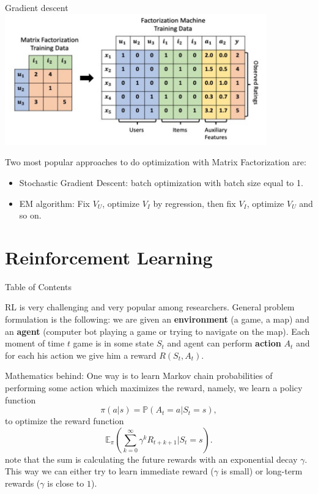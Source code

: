 \documentclass{beamer}
\theoremstyle{remark}
\begin{document}
\begin{frame}{Gradient descent}
    \includegraphics[width=0.85\textwidth]{pictures/recsysfm.png}
    
    Two most popular approaches to do optimization with Matrix Factorization are: 
    \begin{itemize}
        \item Stochastic Gradient Descent: batch optimization with batch size equal to 1.
        \item EM algorithm: Fix $V_{U}$, optimize $V_{I}$ by regression, then fix $V_{I}$, optimize $V_{U}$ and so on.
    \end{itemize}
\end{frame}

\section{Reinforcement Learning}

\begin{frame}{Table of Contents}
    \tableofcontents[currentsection]
\end{frame}

\begin{frame}
    RL is very challenging and very popular among researchers. General problem formulation is the following: we are given an \textbf{environment} (a game, a map) and an \textbf{agent} (computer bot playing a game or trying to navigate on the map). Each moment of time $t$ game is in some state $S_t$ and agent can perform \textbf{action} $A_t$ and for each his action we give him a reward $R(S_t, A_t)$.\vspace{0.1in}
    
    Mathematics behind: One way is to learn Markov chain probabilities of performing some action which maximizes the reward, namely, we learn a policy function
    $$\pi(a|s) = \mathbb{P}(A_t = a| S_t = s),$$
    to optimize the reward function
    $$\mathbb{E}_{\pi}(\sum\limits_{k = 0}^{\infty}\gamma^{k}R_{t+k+1}| S_t = s) .$$
    note that the sum is calculating the future rewards with an exponential decay $\gamma$. This way we can either try to learn immediate reward ($\gamma$ is small) or long-term rewards ($\gamma$ is close to $1$).
\end{frame}
\end{document}
